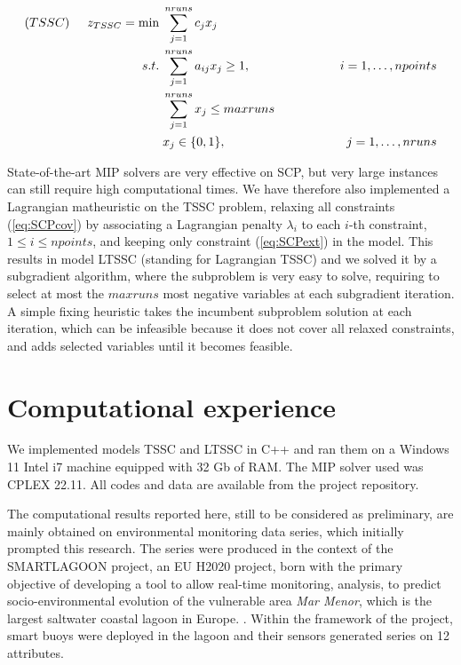 \documentclass[runningheads]{llncs}
\begin{document}
\begin{alignat}{4}
(TSSC) \hspace{0.5cm} z_{TSSC} = \min &\; \sum_{j=1}^{nruns} c_j x_{j}  \label{eq:SCPobj} \\
s.t. &\; \sum_{j=1}^{nruns}a_{ij}x_{j} \geq 1, & \hspace{1.5cm} i=1,\dots,npoints  \label{eq:SCPcov} \\
 &\; \sum_{j=1}^{nruns} x_{j} \leq maxruns \label{eq:SCPext}\\
 &\; x_j \in \{0,1\}, &\; j=1,\dots,nruns  \label{eq:SCPvar}
\end{alignat}

State-of-the-art MIP solvers are very effective on SCP, but very large instances can still require high computational times. We have therefore also implemented a Lagrangian matheuristic \cite{the_book} on the TSSC problem, relaxing all constraints (\ref{eq:SCPcov}) by associating a Lagrangian penalty $\lambda_i$ to each $i$-th constraint, $1 \leq i \leq npoints$, and keeping only constraint (\ref{eq:SCPext}) in the model. This results in model LTSSC (standing for Lagrangian TSSC) and we solved it by a subgradient algorithm, where the subproblem is very easy to solve, requiring to select at most the $maxruns$ most negative variables at each subgradient iteration. A simple fixing heuristic takes the incumbent subproblem solution at each iteration, which can be infeasible because it does not cover all relaxed constraints, and adds selected variables until it becomes feasible.

\section{Computational experience} \label{sec:computation}

We implemented models TSSC and LTSSC in C++ and ran them on a Windows 11 Intel i7 machine equipped with 32 Gb of RAM. The MIP solver used was CPLEX 22.11. All codes and data are available from the project repository.

The computational results reported here, still to be considered as preliminary, are mainly obtained on environmental monitoring data series, which initially prompted this research. The series were produced in the context of the SMARTLAGOON project, an EU H2020 project, born with the primary objective of developing a tool to allow real-time monitoring, analysis, to predict socio-environmental evolution of the vulnerable area {\it Mar Menor}, which is the largest saltwater coastal lagoon in Europe. \cite{smartlagoon}. Within the framework of the project, smart buoys were deployed in the lagoon and their sensors generated series on 12 attributes. 
\end{document}
